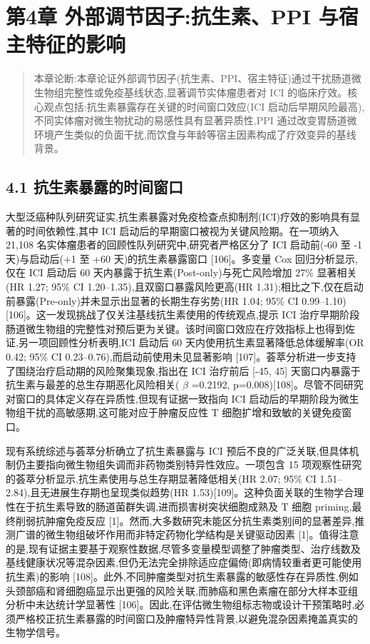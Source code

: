 \section{第4章 外部调节因子:抗生素、PPI 与宿主特征的影响}\label{ux7b2c4ux7ae0-ux5916ux90e8ux8c03ux8282ux56e0ux5b50ux6297ux751fux7d20ppi-ux4e0eux5bbfux4e3bux7279ux5f81ux7684ux5f71ux54cd}

\begin{quote}
本章论断:本章论证外部调节因子(抗生素、PPI、宿主特征)通过干扰肠道微生物组完整性或免疫基线状态,显著调节实体瘤患者对 ICI 的临床疗效。核心观点包括:抗生素暴露存在关键的时间窗口效应(ICI 启动后早期风险最高),不同实体瘤对微生物扰动的易感性具有显著异质性,PPI 通过改变胃肠道微环境产生类似的负面干扰,而饮食与年龄等宿主因素构成了疗效变异的基线背景。
\end{quote}

\subsection{4.1 抗生素暴露的时间窗口}\label{ux6297ux751fux7d20ux66b4ux9732ux7684ux65f6ux95f4ux7a97ux53e3}

大型泛癌种队列研究证实,抗生素暴露对免疫检查点抑制剂(ICI)疗效的影响具有显著的时间依赖性,其中 ICI 启动后的早期窗口被视为关键风险期。在一项纳入 21,108 名实体瘤患者的回顾性队列研究中,研究者严格区分了 ICI 启动前(-60 至 -1 天)与启动后(+1 至 +60 天)的抗生素暴露窗口 {[}106{]}。多变量 Cox 回归分析显示,仅在 ICI 启动后 60 天内暴露于抗生素(Post-only)与死亡风险增加 27\% 显著相关(HR 1.27; 95\% CI 1.20--1.35),且双窗口暴露风险更高(HR 1.31);相比之下,仅在启动前暴露(Pre-only)并未显示出显著的长期生存劣势(HR 1.04; 95\% CI 0.99--1.10){[}106{]}。这一发现挑战了仅关注基线抗生素使用的传统观点,提示 ICI 治疗早期阶段肠道微生物组的完整性对预后更为关键。该时间窗口效应在疗效指标上也得到佐证,另一项回顾性分析表明,ICI 启动后 60 天内使用抗生素显著降低总体缓解率(OR 0.42; 95\% CI 0.23--0.76),而启动前使用未见显著影响 {[}107{]}。荟萃分析进一步支持了围绕治疗启动期的风险聚集现象,指出在 ICI 治疗前后 {[}-45, 45{]} 天窗口内暴露于抗生素与最差的总生存期恶化风险相关( \(\beta\) =0.2192, p=0.008){[}108{]}。尽管不同研究对窗口的具体定义存在异质性,但现有证据一致指向 ICI 启动后的早期阶段为微生物组干扰的高敏感期,这可能对应于肿瘤反应性 T 细胞扩增和致敏的关键免疫窗口。

现有系统综述与荟萃分析确立了抗生素暴露与 ICI 预后不良的广泛关联,但具体机制仍主要指向微生物组失调而非药物类别特异性效应。一项包含 15 项观察性研究的荟萃分析显示,抗生素使用与总生存期显著降低相关(HR 2.07; 95\% CI 1.51--2.84),且无进展生存期也呈现类似趋势(HR 1.53){[}109{]}。这种负面关联的生物学合理性在于抗生素导致的肠道菌群失调,进而损害树突状细胞成熟及 T 细胞 priming,最终削弱抗肿瘤免疫反应 {[}1{]}。然而,大多数研究未能区分抗生素类别间的显著差异,推测广谱的微生物组破坏作用而非特定药物化学结构是关键驱动因素 {[}1{]}。值得注意的是,现有证据主要基于观察性数据,尽管多变量模型调整了肿瘤类型、治疗线数及基线健康状况等混杂因素,但仍无法完全排除适应症偏倚(即病情较重者更可能使用抗生素)的影响 {[}108{]}。此外,不同肿瘤类型对抗生素暴露的敏感性存在异质性,例如头颈部癌和肾细胞癌显示出更强的风险关联,而肺癌和黑色素瘤在部分大样本亚组分析中未达统计学显著性 {[}106{]}。因此,在评估微生物组标志物或设计干预策略时,必须严格校正抗生素暴露的时间窗口及肿瘤特异性背景,以避免混杂因素掩盖真实的生物学信号。

